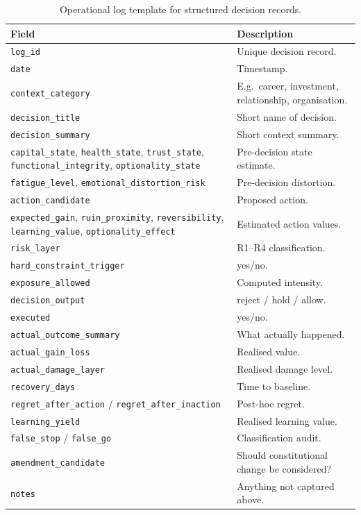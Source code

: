 \begin{table}[ht]
\centering
\scriptsize
\begin{tabularx}{\linewidth}{lX}
\toprule
\textbf{Field} & \textbf{Description} \\
\midrule
\texttt{log\_id} & Unique decision record. \\
\texttt{date} & Timestamp. \\
\texttt{context\_category} & E.g.\ career, investment, relationship,
organisation. \\
\texttt{decision\_title} & Short name of decision. \\
\texttt{decision\_summary} & Short context summary. \\
\texttt{capital\_state}, \texttt{health\_state},
\texttt{trust\_state}, \texttt{functional\_integrity},
\texttt{optionality\_state}
& Pre-decision state estimate. \\
\texttt{fatigue\_level}, \texttt{emotional\_distortion\_risk}
& Pre-decision distortion. \\
\texttt{action\_candidate} & Proposed action. \\
\texttt{expected\_gain}, \texttt{ruin\_proximity},
\texttt{reversibility}, \texttt{learning\_value},
\texttt{optionality\_effect}
& Estimated action values. \\
\texttt{risk\_layer} & R1--R4 classification. \\
\texttt{hard\_constraint\_trigger} & yes/no. \\
\texttt{exposure\_allowed} & Computed intensity. \\
\texttt{decision\_output} & reject / hold / allow. \\
\texttt{executed} & yes/no. \\
\texttt{actual\_outcome\_summary} & What actually happened. \\
\texttt{actual\_gain\_loss} & Realised value. \\
\texttt{actual\_damage\_layer} & Realised damage level. \\
\texttt{recovery\_days} & Time to baseline. \\
\texttt{regret\_after\_action} / \texttt{regret\_after\_inaction}
& Post-hoc regret. \\
\texttt{learning\_yield} & Realised learning value. \\
\texttt{false\_stop} / \texttt{false\_go}
& Classification audit. \\
\texttt{amendment\_candidate} & Should constitutional change be
considered? \\
\texttt{notes} & Anything not captured above. \\
\bottomrule
\end{tabularx}
\caption[Omega operational log template]{Operational log template
for structured decision records.}
\label{tab:omega-log-template}
\end{table}


